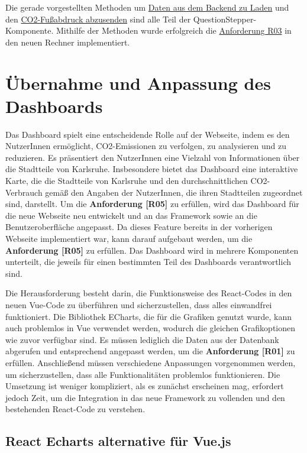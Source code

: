 Die gerade vorgestellten Methoden um \hyperref[lst:daten-aus-backend]{Daten aus dem Backend zu Laden} und den \hyperref[lst:upload-methode]{CO2-Fußabdruck abzusenden} sind alle Teil der QuestionStepper-Komponente.
Mithilfe der Methoden wurde erfolgreich die \hyperref[sec:hochladen-von-co2daten]{Anforderung R03} in den neuen Rechner implementiert.

\section{Übernahme und Anpassung des Dashboards}

Das Dashboard spielt eine entscheidende Rolle auf der Webseite, indem es den NutzerInnen ermöglicht, CO2-Emissionen zu verfolgen, zu analysieren und zu reduzieren. Es präsentiert den NutzerInnen eine Vielzahl von Informationen über die Stadtteile von Karlsruhe. Insbesondere bietet das Dashboard eine interaktive Karte, die die Stadtteile von Karlsruhe und den durchschnittlichen CO2-Verbrauch gemäß den Angaben der NutzerInnen, die ihren Stadtteilen zugeordnet sind, darstellt. Um die \textbf{Anforderung [R05]} zu erfüllen, wird das Dashboard für die neue Webseite neu entwickelt und an das Framework sowie an die Benutzeroberfläche angepasst. Da dieses Feature bereits in der vorherigen Webseite implementiert war, kann darauf aufgebaut werden, um die \textbf{Anforderung [R05]} zu erfüllen. Das Dashboard wird in mehrere Komponenten unterteilt, die jeweils für einen bestimmten Teil des Dashboards verantwortlich sind.

Die Herausforderung besteht darin, die Funktionsweise des React-Codes in den neuen Vue-Code zu überführen und sicherzustellen, dass alles einwandfrei funktioniert. Die Bibliothek ECharts, die für die Grafiken genutzt wurde, kann auch problemlos in Vue verwendet werden, wodurch die gleichen Grafikoptionen wie zuvor verfügbar sind. Es müssen lediglich die Daten aus der Datenbank abgerufen und entsprechend angepasst werden, um die \textbf{Anforderung [R01]} zu erfüllen.
Anschließend müssen verschiedene Anpassungen vorgenommen werden, um sicherzustellen, dass alle Funktionalitäten problemlos funktionieren.
Die Umsetzung ist weniger kompliziert, als es zunächst erscheinen mag, erfordert jedoch Zeit, um die Integration in das neue Framework zu vollenden und den bestehenden React-Code zu verstehen.

\subsection{React Echarts alternative für Vue.js}

